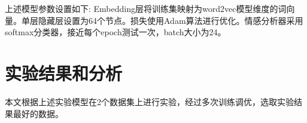 \documentclass[a4paper,AutoFakeBold,oneside,12pt]{book}
\begin{document}
%
%
%
%
%
%
%
%
%
%
%

上述模型参数设置如下: Embedding层将训练集映射为word2vec模型维度的词向量。单层隐藏层设置为64个节点。损失使用Adam算法进行优化。情感分析器采用softmax分类器，接近每个epoch测试一次，batch大小为24。

\section{实验结果和分析}
本文根据上述实验模型在2个数据集上进行实验，经过多次训练调优，选取实验结果最好的数据。
\end{document}
